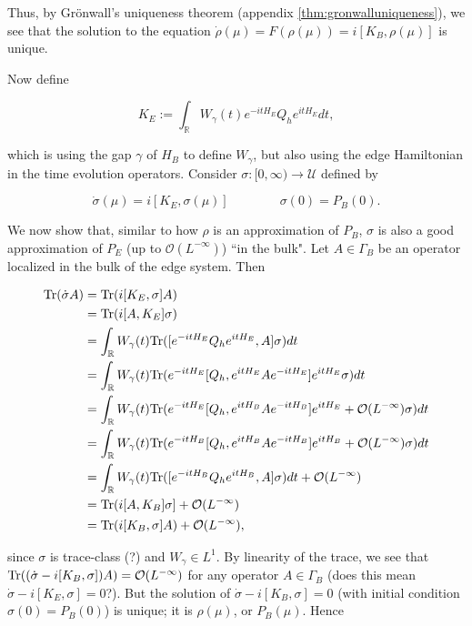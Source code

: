\documentclass[12pt, letterpaper]{article}
\begin{document}
Thus, by Gr\"{o}nwall's uniqueness theorem (appendix \ref{thm:gronwalluniqueness}), we see that the solution to the equation $\dot{\rho}(\mu) = F(\rho(\mu)) = i[K_B,\rho(\mu)]$ is unique. 

Now define 

\[K_E := \int_\mathbb{R} W_\gamma(t) e^{-itH_E}Q_he^{itH_E}dt,\]

which is using the gap $\gamma$ of $H_B$ to define $W_\gamma$, but also using the edge Hamiltonian in the time evolution operators. Consider $\sigma:[0,\infty)\to\mathcal{U}$ defined by

\[\dot{\sigma}(\mu) = i[K_E, \sigma(\mu)] \quad\quad\quad\quad \sigma(0) = P_B(0).\]

We now show that, similar to how $\rho$ is an approximation of $P_B$, $\sigma$ is also a good approximation of $P_E$ (up to $\mathcal{O}(L^{-\infty})$) ``in the bulk". Let $A\in \Gamma_B$ be an operator localized in the bulk of the edge system. Then 

\[\begin{aligned}
\text{Tr}(\dot{\sigma} A) &= \text{Tr} (i[K_E, \sigma]A)\\
&= \text{Tr}(i[A,K_E]\sigma)\\
&= \int_\mathbb{R}W_\gamma(t) \text{Tr}([e^{-itH_E}Q_he^{itH_E}, A] \sigma)dt\\
&= \int_\mathbb{R}W_\gamma(t) \text{Tr}(e^{-itH_E}[Q_h, e^{itH_E}Ae^{-itH_E}]e^{itH_E} \sigma)dt\\
&= \int_\mathbb{R}W_\gamma(t) \text{Tr}(e^{-itH_E}[Q_h, e^{itH_B}Ae^{-itH_B}]e^{itH_E} + \mathcal{O}(L^{-\infty})\sigma)dt\\
&= \int_\mathbb{R}W_\gamma(t) \text{Tr}(e^{-itH_B}[Q_h, e^{itH_B}Ae^{-itH_B}]e^{itH_B} + \mathcal{O}(L^{-\infty})\sigma)dt\\
&= \int_\mathbb{R}W_\gamma(t) \text{Tr}([e^{-itH_B}Q_he^{itH_B}, A] \sigma)dt + \mathcal{O}(L^{-\infty})\\
&= \text{Tr}(i[A,K_B]\sigma] + \mathcal{O}(L^{-\infty})\\
&= \text{Tr}(i[K_B,\sigma]A) + \mathcal{O}(L^{-\infty}),
\end{aligned}\]

since $\sigma$ is trace-class (?) and $W_\gamma \in L^1$. By linearity of the trace, we see that $\text{Tr}((\dot{\sigma} - i[K_B,\sigma])A) = \mathcal{O}(L^{-\infty})$ for any operator $A \in \Gamma_B$ (does this mean $\dot{\sigma}-i[K_E,\sigma] = 0$?). But the solution of $\dot{\sigma} - i[K_B,\sigma] = 0$ (with initial condition $\sigma(0)=P_B(0)$) is unique; it is $\rho(\mu)$, or $P_B(\mu)$. Hence
\end{document}
